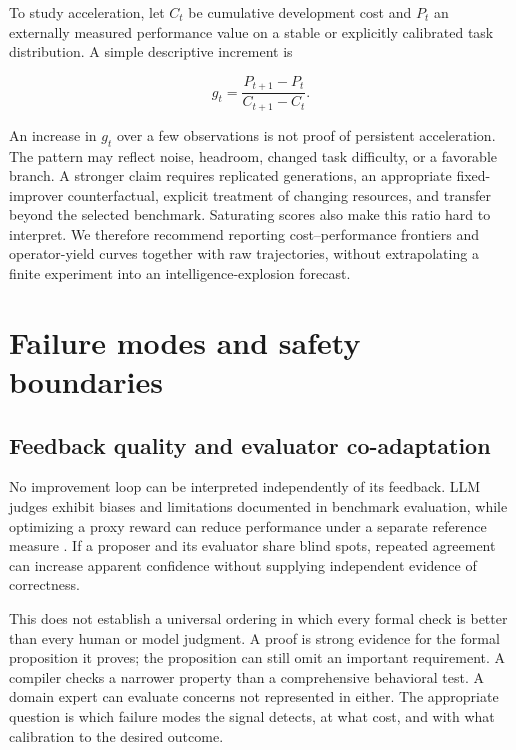 \documentclass[11pt,american,]{article}
\begin{document}
To study acceleration, let \(C_t\) be cumulative development cost and
\(P_t\) an externally measured performance value on a stable or
explicitly calibrated task distribution. A simple descriptive increment
is

\[
 g_t=\frac{P_{t+1}-P_t}{C_{t+1}-C_t}.
\]

An increase in \(g_t\) over a few observations is not proof of
persistent acceleration. The pattern may reflect noise, headroom,
changed task difficulty, or a favorable branch. A stronger claim
requires replicated generations, an appropriate fixed-improver
counterfactual, explicit treatment of changing resources, and transfer
beyond the selected benchmark. Saturating scores also make this ratio
hard to interpret. We therefore recommend reporting cost--performance
frontiers and operator-yield curves together with raw trajectories,
without extrapolating a finite experiment into an intelligence-explosion
forecast.

\hypertarget{failure-modes-and-safety-boundaries}{%
\section{Failure modes and safety
boundaries}\label{failure-modes-and-safety-boundaries}}

\hypertarget{feedback-quality-and-evaluator-co-adaptation}{%
\subsection{Feedback quality and evaluator
co-adaptation}\label{feedback-quality-and-evaluator-co-adaptation}}

No improvement loop can be interpreted independently of its feedback.
LLM judges exhibit biases and limitations documented in benchmark
evaluation, while optimizing a proxy reward can reduce performance under
a separate reference measure \citep{judge2023, rewardoveropt2022}. If a
proposer and its evaluator share blind spots, repeated agreement can
increase apparent confidence without supplying independent evidence of
correctness.

This does not establish a universal ordering in which every formal check
is better than every human or model judgment. A proof is strong evidence
for the formal proposition it proves; the proposition can still omit an
important requirement. A compiler checks a narrower property than a
comprehensive behavioral test. A domain expert can evaluate concerns not
represented in either. The appropriate question is which failure modes
the signal detects, at what cost, and with what calibration to the
desired outcome.
\end{document}
